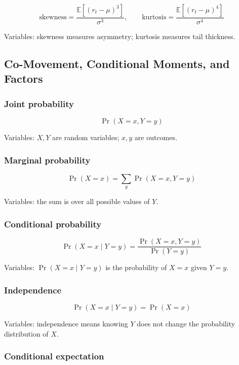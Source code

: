 \documentclass[
  8pt,
  twocolumn]{extarticle}
\begin{document}
\[
\text{skewness}=\frac{\mathbb E[(r_t-\mu)^3]}{\sigma^3},\qquad
\text{kurtosis}=\frac{\mathbb E[(r_t-\mu)^4]}{\sigma^4}
\]

Variables: skewness measures asymmetry; kurtosis measures tail
thickness.

\subsection{Co-Movement, Conditional Moments, and
Factors}\label{co-movement-conditional-moments-and-factors}

\subsubsection{Joint probability}\label{joint-probability}

\[
\Pr(X=x,Y=y)
\]

Variables: \(X,Y\) are random variables; \(x,y\) are outcomes.

\subsubsection{Marginal probability}\label{marginal-probability}

\[
\Pr(X=x)=\sum_y\Pr(X=x,Y=y)
\]

Variables: the sum is over all possible values of \(Y\).

\subsubsection{Conditional probability}\label{conditional-probability}

\[
\Pr(X=x\mid Y=y)=\frac{\Pr(X=x,Y=y)}{\Pr(Y=y)}
\]

Variables: \(\Pr(X=x\mid Y=y)\) is the probability of \(X=x\) given
\(Y=y\).

\subsubsection{Independence}\label{independence}

\[
\Pr(X=x\mid Y=y)=\Pr(X=x)
\]

Variables: independence means knowing \(Y\) does not change the
probability distribution of \(X\).

\subsubsection{Conditional expectation}\label{conditional-expectation}
\end{document}
